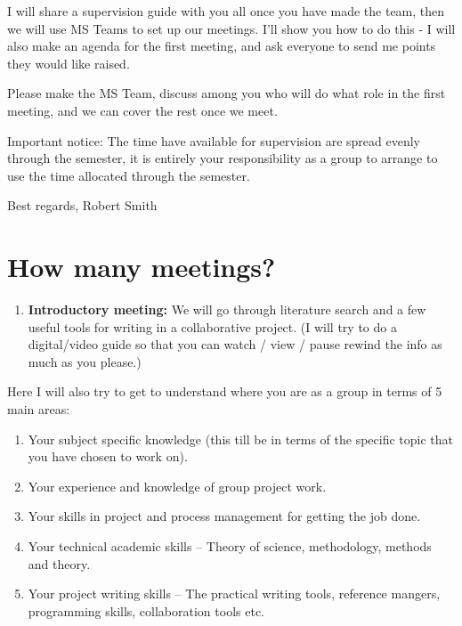 \documentclass[
]{book}
\providecommand{\tightlist}{%
  \setlength{\itemsep}{0pt}\setlength{\parskip}{0pt}}
\begin{document}
I will share a supervision guide with you all once you have made the team, then we will use MS Teams to set up our meetings. I'll show you how to do this - I will also make an agenda for the first meeting, and ask everyone to send me points they would like raised.

Please make the MS Team, discuss among you who will do what role in the first meeting, and we can cover the rest once we meet.

Important notice:
The time have available for supervision are spread evenly through the semester, it is entirely your responsibility as a group to arrange to use the time allocated through the semester.

Best regards,
Robert Smith

\hypertarget{how-many-meetings}{%
\section{How many meetings?}\label{how-many-meetings}}

\begin{enumerate}
\def\labelenumi{\arabic{enumi}.}
\tightlist
\item
  \textbf{Introductory meeting:} We will go through literature search and a
  few useful tools for writing in a collaborative project. (I will try to
  do a digital/video guide so that you can watch / view / pause rewind the
  info as much as you please.)
\end{enumerate}

Here I will also try to get to understand where you are as a group in
terms of 5 main areas:

\begin{enumerate}
\def\labelenumi{\alph{enumi}.}
\item
  Your subject specific knowledge (this till be in terms of the
  specific topic that you have chosen to work on).
\item
  Your experience and knowledge of group project work.
\item
  Your skills in project and process management for getting the job
  done.
\item
  Your technical academic skills -- Theory of science, methodology,
  methods and theory.
\item
  Your project writing skills -- The practical writing tools,
  reference mangers, programming skills, collaboration tools etc.
\end{enumerate}
\end{document}
